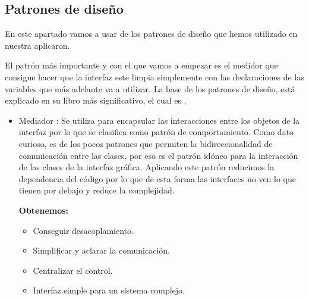 \subsection{Patrones de diseño}
En este apartado vamos a usar de los patrones de diseño que hemos utilizado en nuestra aplicaron.

El patrón más importante y con el que vamos a empezar es el medidor que consigue hacer que la interfaz este limpia simplemente con las declaraciones de las variables que más adelante va a utilizar.
La base de los patrones de diseño, está explicado en su libro más significativo, el cual es \cite{Hunt2013}.

\begin{itemize}
\item Mediador \cite{wiki:Mediador}: Se utiliza para encapsular las interacciones entre los objetos de la interfaz por lo que se clasifica como patrón de comportamiento.
Como dato curioso, es de los pocos patrones que permiten la bidireccionalidad de comunicación entre las clases, por eso es el patrón idóneo para la interacción de las clases de la interfaz gráfica.
Aplicando este patrón reducimos la dependencia del código por lo que de esta forma las interfaces no ven lo que tienen por debajo y reduce la complejidad.

\textbf{Obtenemos:}
\begin{itemize}
\item Conseguir desacoplamiento.
\item Simplificar y aclarar la comunicación.
\item Centralizar el control.
\item Interfaz simple para un sistema complejo.
\end{itemize}


\end{itemize}
